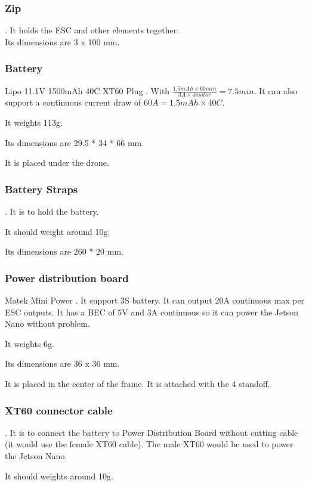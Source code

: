\subsubsection{Zip}
\cite{bangood_zip_ties}. It holds the ESC and other elements together.\\
Its dimensions are 3 x 100 mm.

\subsubsection{Battery}
Lipo 11.1V 1500mAh 40C XT60 Plug \cite{bangood_battery}. With $ \frac{1.5mAh \times 60min}{3A \times 4motor}= 7.5min$. It can also support a continuous current draw of $60A = 1.5mAh\times 40C$.

It weights 113g.

Its dimensions are 29.5 * 34 * 66 mm.

It is placed under the drone.

\subsubsection{Battery Straps}
\cite{bangood_battery_strap}. It is to hold the battery.

It should weight around 10g.

Its dimensions are 260 * 20 mm.

\subsubsection{Power distribution board}
Matek Mini Power \cite{bangood_pdb}. It support 3S battery. It can output 20A continuous max per ESC outputs. It has a BEC of 5V and 3A continuous so it can power the Jetson Nano without problem.

It weights 6g.

Its dimensions are 36 x 36 mm.

It is placed in the center of the frame. It is attached with the 4 standoff.

\subsubsection{XT60 connector cable}
\cite{bangood_xt60_cable}. It is to connect the battery to Power Distribution Board without cutting cable (it would use the female XT60 cable). The male XT60 would be used to power the Jetson Nano.

It should weights around 10g.

